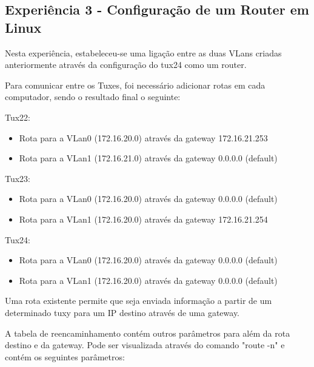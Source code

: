 \documentclass[11pt]{article}
\begin{document}
\subsection{Experiência 3 - Configuração de um Router em Linux}

Nesta experiência, estabeleceu-se uma ligação entre as duas VLans criadas anteriormente através da configuração do tux24 como um router.

Para comunicar entre os Tuxes, foi necessário adicionar rotas em cada computador, sendo o resultado final o seguinte:

Tux22:
\begin{itemize}
\item Rota para a VLan0 (172.16.20.0) através da gateway 172.16.21.253
\item Rota para a VLan1 (172.16.21.0) através da gateway 0.0.0.0 (default)

\end{itemize}

Tux23:
\begin{itemize}
\item Rota para a VLan0 (172.16.20.0) através da gateway 0.0.0.0 (default)
\item Rota para a VLan1 (172.16.20.0) através da gateway 172.16.21.254

\end{itemize}

Tux24:
\begin{itemize}
\item Rota para a VLan0 (172.16.20.0) através da gateway 0.0.0.0 (default)
\item Rota para a VLan1 (172.16.20.0) através da gateway 0.0.0.0 (default)
	
\end{itemize}

Uma rota existente permite que seja enviada informação a partir de um determinado tuxy para um IP destino através de uma gateway.


A tabela de reencaminhamento contém outros parâmetros para além da rota destino e da gateway. Pode ser visualizada através do comando "route -n" e contém os seguintes parâmetros:
\end{document}
